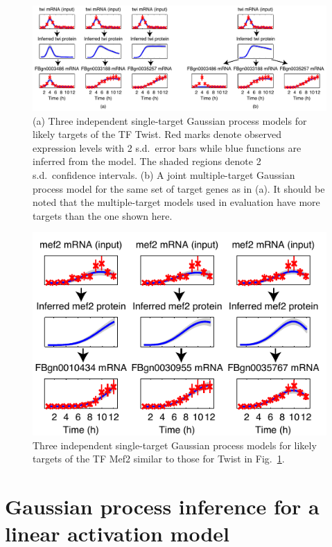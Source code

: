 \documentclass{pnastwo}
\begin{document}
\begin{article}
\begin{figure}[tb]
  \centering
  \includegraphics{dros_gpdisim_models}
  \caption{(a) Three independent single-target Gaussian process models
    for likely targets of the TF Twist. Red marks denote observed expression
    levels with 2 s.d.\ error bars while blue functions are inferred
    from the model.  The shaded regions denote 2 s.d.\ confidence
    intervals. (b) A joint multiple-target Gaussian process model for
    the same set of target genes as in (a). It should be noted that
    the multiple-target models used in evaluation have more targets
    than the one shown here.\label{fig:gpdisim_models}
}
\end{figure}

\begin{figure}[tb]
  \centering
  \includegraphics{dros_gpdisim_mef2_singletarget_models}
  \caption{Three independent single-target Gaussian process models for
    likely targets of the TF Mef2 similar to those for Twist in
    Fig.~\ref{fig:gpdisim_models}.\label{fig:gpdisim_mef2_models} }
\end{figure}

\section{Gaussian process inference for a linear activation model}


\end{article}
\end{document}
